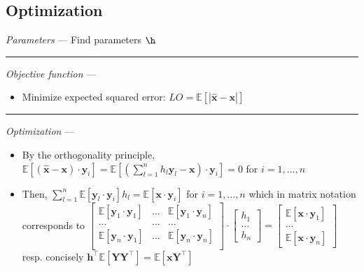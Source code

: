 \subsection*{Optimization}
\emph{Parameters} --- Find parameters $\boldsymbol{\h}$

{\color{lightgray}\hrule height 0.001mm}

\emph{Objective function} --- 
\begin{itemize}
    \item Minimize expected squared error: $LO = \mathbb{E}[ | \hat{\boldsymbol{x}} - \boldsymbol{x} | ]$
\end{itemize}

{\color{lightgray}\hrule height 0.001mm}

\emph{Optimization} ---
\begin{itemize}
    \item By the orthogonality principle, $\mathbb{E} [ ( \hat{\boldsymbol{x}} - \boldsymbol{x} ) \cdot \boldsymbol{y}_i ] = \mathbb{E} [ ( \sum_{l=1}^n h_l \boldsymbol{y}_l - \boldsymbol{x} ) \cdot \boldsymbol{y}_i ] = 0$ for $i = 1, ..., n$
    \item Then, $\sum_{l=1}^n \mathbb{E}[ \boldsymbol{y}_l \cdot \boldsymbol{y}_i ] h_l = \mathbb{E}[ \boldsymbol{x} \cdot \boldsymbol{y}_i ]$ for $i = 1, ..., n$ which in matrix notation corresponds to
    $\begin{bmatrix}
    \mathbb{E}[\boldsymbol{y}_1 \cdot \boldsymbol{y}_1] & ... & \mathbb{E}[\boldsymbol{y}_1 \cdot \boldsymbol{y}_n]\\
    ... & ... & ...\\
    \mathbb{E}[\boldsymbol{y}_n \cdot \boldsymbol{y}_1] & ... & \mathbb{E}[\boldsymbol{y}_n \cdot \boldsymbol{y}_n]\\
    \end{bmatrix} \cdot 
    \begin{bmatrix}
    h_1 \\
    ... \\
    h_n
    \end{bmatrix} = 
    \begin{bmatrix}
    \mathbb{E}[\boldsymbol{x} \cdot \boldsymbol{y}_1]\\
    ...\\
    \mathbb{E}[\boldsymbol{x} \cdot \boldsymbol{y}_n]
    \end{bmatrix}$
    resp. concisely
    $\boldsymbol{h}^\intercal \mathbb{E}[ \boldsymbol{Y} \boldsymbol{Y}^\intercal ] = \mathbb{E}[\boldsymbol{x}  \boldsymbol{Y}^\intercal]$
\end{itemize}